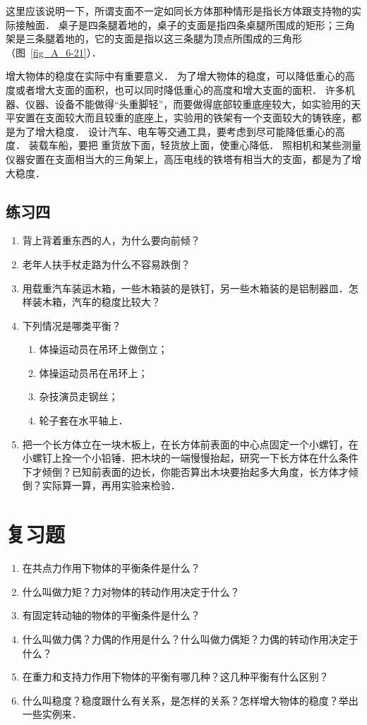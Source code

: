 这里应该说明一下，所谓支面不一定如同长方体那种情形是指长方体跟支持物的实际接触面．
桌子是四条腿着地的，桌子的支面是指四条桌腿所围成的矩形；三角架是三条腿着地的，它的支面是指以这三条腿为顶点所围成的三角形（图~\ref{fig_A_6-21}）．


增大物体的稳度在实际中有重要意义．
为了增大物体的稳度，可以降低重心的高度或者增大支面的面积，也可以同时降低重心的高度和增大支面的面积．
许多机器、仪器、设备不能做得“头重脚轻”，而要做得底部较重底座较大，如实验用的天平安置在支面较大而且较重的底座上，实验用的铁架有一个支面较大的铸铁座，都是为了增大稳度．
设计汽车、电车等交通工具，要考虑到尽可能降低重心的高度．
装载车船，要把
重货放下面，轻货放上面，使重心降低．
照相机和某些测量仪器安置在支面相当大的三角架上，高压电线的铁塔有相当大的支面，都是为了增大稳度．

\subsection*{练习四}
\begin{enumerate}
    \item 背上背着重东西的人，为什么要向前倾？
    \item 老年人扶手杖走路为什么不容易跌倒？
    \item 用载重汽车装运木箱，一些木箱装的是铁钉，另一些木箱装的是铝制器皿．怎样装木箱，汽车的稳度比较大？
    \item 下列情况是哪类平衡？
    \begin{enumerate}
        \item 体操运动员在吊环上做倒立；
        \item 体操运动员吊在吊环上；
        \item 杂技演员走钢丝；
        \item 轮子套在水平轴上．
    \end{enumerate}
    \item 把一个长方体立在一块木板上，在长方体前表面的中心点固定一个小螺钉，在小螺钉上拴一个小铅锤．把木块的一端慢慢抬起，研究一下长方体在什么条件下才倾倒？已知前表面的边长，你能否算出木块要抬起多大角度，长方体才倾倒？实际算一算，再用实验来检验．
\end{enumerate}

\section*{复习题}

\begin{enumerate}
    \item 在共点力作用下物体的平衡条件是什么？
    \item 什么叫做力矩？力对物体的转动作用决定于什么？
    \item 有固定转动轴的物体的平衡条件是什么？
    \item 什么叫做力偶？力偶的作用是什么？什么叫做力偶矩？力偶的转动作用决定于什么？
    \item 在重力和支持力作用下物体的平衡有哪几种？这几种平衡有什么区别？
    \item 什么叫稳度？稳度跟什么有关系，是怎样的关系？怎样增大物体的稳度？举出一些实例来．
\end{enumerate}

